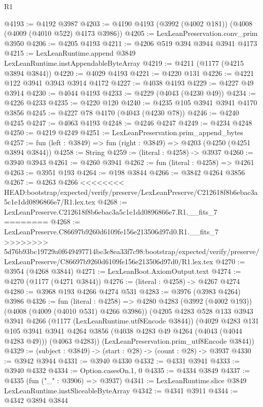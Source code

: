 \begin{lexlean}{R1}
\begin{coremodule}
{{{{{{{{{{{{{{{{{{{{{{{{{{{{{{{{{{{{{{{{{{{{{{{{{{{{{{{{{{{{{{{{{{{{{{{{{{{{{{{{{{{{{{{{{{{{{{{{{{{{{{{{{{{{{{{{{{{{{{{{{{{{{{{{{{{{{{{{{{{{{{{{{{{{{{{{{{{{{{{{{{{{{{{{{{{{{{{{{{{{{{{{{{@4193 := @4192 @3987
@4203 := @4190 @4193 (@3992 (@4002 @181)) (@4008 (@4009 (@4010 @522) @4173 @3986))
@4205 := LexLeanPreservation.conv_prim @3950
@4206 := @4205 @4193
@4211 := @4206 @519 @394 @3944 @3941 @4173
@4215 := LexLeanRuntime.append @3849 LexLeanRuntime.instAppendableByteArray
@4219 := @4211 (@1177 (@4215 @3894 @3844))
@4220 := @4029 @4193
@4221 := @4220 @131
@4226 := @4221 @122 @3941 @3943 @3914 @4172
@4227 := @4038 @4193
@4229 := @4227 @49 @3914
@4230 := @4044 @4193
@4233 := @4229 (@4043 (@4230 @49))
@4234 := @4226 @4233
@4235 := @4220 @120
@4240 := @4235 @105 @3941 @3941 @4170 @3856
@4245 := @4227 @78 @4170 (@4043 (@4230 @78))
@4246 := @4240 @4245
@4247 := @4063 @4193
@4248 := @4246 @4247
@4249 := @4234 @4248
@4250 := @4219 @4249
@4251 := LexLeanPreservation.prim_append_bytes
@4257 := fun (left : @3849) => fun (right : @3849) => @4203 (@4250 (@4251 @3894 @3844))
@4258 := String
@4259 := (literal : @4258) -> @3937
@4260 := @3940 @3943
@4261 := @4260 @3941
@4262 := fun (literal : @4258) => @4261
@4263 := @3951 @193
@4264 := @198 @3844
@4266 := @3842 @4264 @3856
@4267 := @4263 @4266
<<<<<<<< HEAD:bootstrap/expected/verify/preserve/LexLeanPreserve/C212618f8b6ebac3a5c1e1dd0896866e7/R1.lex.tex
@4268 := LexLeanPreserve.C212618f8b6ebac3a5c1e1dd0896866e7.R1.__fits_7
========
@4268 := LexLeanPreserve.C86697b9260d6109fe156e213506d97d0.R1.__fits_7
>>>>>>>> 5d76b93bc19729a0f649497714bc3c8ea33f7c98:bootstrap/expected/verify/preserve/LexLeanPreserve/C86697b9260d6109fe156e213506d97d0/R1.lex.tex
@4270 := @3954 (@4268 @3844)
@4271 := LexLeanBoot.AxiomOutput.text
@4274 := @4270 (@1177 (@4271 @3844))
@4276 := (literal : @4258) -> @4267 @4274
@4280 := @3968 @193 @4266 @4274 @531
@4283 := @3976 (@3983 @4264) @3986
@4326 := fun (literal : @4258) =>
  @4280
    @4283
    (@3992 (@4002 @193))
    (@4008 (@4009 (@4010 @531) @4266 @3986))
    (@4205
      @4283
      @528
      @133
      @3943
      @3941
      @4266
      (@1177 (LexLeanRuntime.utf8Encode @3844))
      (@4029
        @4283
        @131
        @105
        @3941
        @3941
        @4264
        @3856
        (@4038 @4283 @49 @4264 (@4043 (@4044 @4283 @49)))
        (@4063 @4283))
      (LexLeanPreservation.prim_utf8Encode @3844))
@4329 := (subject : @3849) -> (start : @28) -> (count : @28) -> @3937
@4330 := @3942 @3944
@4331 := @3940 @4330
@4332 := @4331 @3941
@4333 := @3940 @4332
@4334 := Option.casesOn.{1, 0}
@4335 := @4334 @3849
@4337 := @4335 (fun ("_" : @3906) => @3937)
@4341 := LexLeanRuntime.slice @3849 LexLeanRuntime.instSliceableByteArray
@4342 := @4341 @3911
@4344 := @4342 @3894 @3844
}}}}}}}}}}}}}}}}}}}}}}}}}}}}}}}}}}}}}}}}}}}}}}}}}}}}}}}}}}}}}}}}}}}}}}}}}}}}}}}}}}}}}}}}}}}}}}}}}}}}}}}}}}}}}}}}}}}}}}}}}}}}}}}}}}}}}}}}}}}}}}}}}}}}}}}}}}}}}}}}}}}}}}}}}}}}}}}}}}}}}}}}}}
\end{coremodule}
\end{lexlean}
